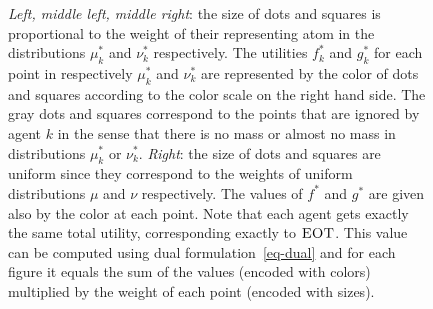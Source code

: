 \begin{figure}[h!]
\begin{tabular}{@{}c@{}c@{}c@{}c@{}}
\end{tabular}
\caption{\emph{Left, middle left, middle right}: the size of dots and squares is proportional to the weight of their representing atom in the distributions $\mu_k^{*}$ and $\nu_k^{*}$ respectively. %
The utilities $f_k^{*}$ and $g_k^{*}$ for each point in respectively $\mu_k^{*}$ and $\nu_k^{*}$ are represented by the color of dots and squares according to the color scale on the right hand side. The gray dots and squares correspond to the points that are ignored by agent $k$ in the sense that there is no mass or almost no mass in distributions $\mu^*_k$ or $\nu^*_k$. \emph{Right}: the size of dots and squares are uniform since they correspond to the weights of uniform distributions $\mu$ and $\nu$ respectively. The values of $f^*$ and $g^*$ are given also by the color at each point. Note that each agent gets exactly the same total utility, corresponding exactly to $\textsc{EOT}$. This value can be computed using dual formulation~\eqref{eq-dual} and for each figure it equals the sum of the values (encoded with colors) multiplied by the weight of each point (encoded with sizes).\label{fig-dual-appendix-fair}}
\end{figure}

